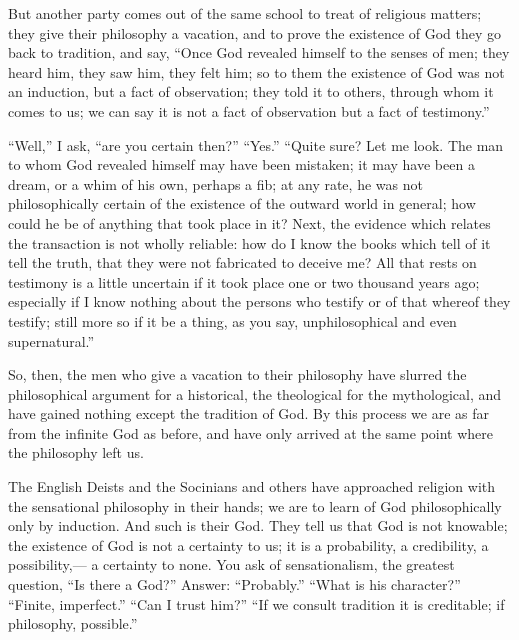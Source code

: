 \documentclass[12pt]{article}
\begin{document}
But another party comes out of the same school to treat of religious matters; they give their philosophy a vacation, and to prove the existence of God they go back to tradition, and say, ``Once God revealed himself to the senses of men; they heard him, they saw him, they felt him; so to them the existence of God was not an induction, but a fact of observation; they told it to others, through whom it comes to us; we can say it is not a fact of observation but a fact of testimony.'' 

``Well,'' I ask, ``are you certain then?'' ``Yes.'' ``Quite sure? Let me look. The man to whom God revealed himself may have been mistaken; it may have been a dream, or a whim of his own, perhaps a fib; at any rate, he was not philosophically certain of the existence of the outward world in general; how could he be of anything that took place in it? Next, the evidence which relates the transaction is not wholly reliable: how do I know the books which tell of it tell the truth, that they were not fabricated to deceive me? All that rests on testimony is a little uncertain if it took place one or two thousand years ago; especially if I know nothing about the persons who testify or of that whereof they testify; still more so if it be a thing, as you say, unphilosophical and even supernatural.'' 

So, then, the men who give a vacation to their philosophy have slurred the philosophical argument for a historical, the theological for the mythological, and have gained nothing except the tradition of God. By this process we are as far from the infinite God as before, and have only arrived at the same point where the philosophy left us. 

The English Deists and the Socinians and others have approached religion with the sensational philosophy in their hands; we are to learn of God philosophically only by induction. And such is their God. They tell us that God is not knowable; the existence of God is not a certainty to us; it is a probability, a credibility, a possibility,--- a certainty to none. You ask of sensationalism, the greatest question, ``Is there a God?'' Answer: ``Probably.'' ``What is his character?'' ``Finite, imperfect.'' ``Can I trust him?'' ``If we consult tradition it is creditable; if philosophy, possible.'' 
\end{document}
